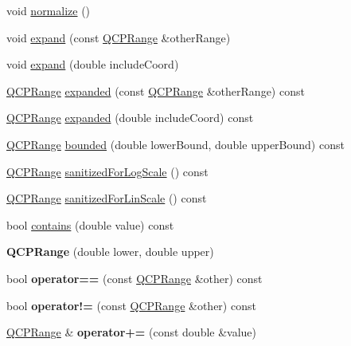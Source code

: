 \begin{DoxyCompactItemize}
void \hyperlink{class_q_c_p_range_af914a7740269b0604d0827c634a878a9}{normalize} ()
\item 
void \hyperlink{class_q_c_p_range_a0fa1bc8048be50d52bea93a8caf08305}{expand} (const \hyperlink{class_q_c_p_range}{Q\+C\+P\+Range} \&other\+Range)
\item 
void \hyperlink{class_q_c_p_range_a5fa977db0a4b7800075c629c62cf5e80}{expand} (double include\+Coord)
\item 
\hyperlink{class_q_c_p_range}{Q\+C\+P\+Range} \hyperlink{class_q_c_p_range_a9cbfb7cd06eac1839cae981e05c19633}{expanded} (const \hyperlink{class_q_c_p_range}{Q\+C\+P\+Range} \&other\+Range) const
\item 
\hyperlink{class_q_c_p_range}{Q\+C\+P\+Range} \hyperlink{class_q_c_p_range_af81d70f1add7233d73a19dcbe5decb2e}{expanded} (double include\+Coord) const
\item 
\hyperlink{class_q_c_p_range}{Q\+C\+P\+Range} \hyperlink{class_q_c_p_range_a22151e18d961d762d25721211e89c2e5}{bounded} (double lower\+Bound, double upper\+Bound) const
\item 
\hyperlink{class_q_c_p_range}{Q\+C\+P\+Range} \hyperlink{class_q_c_p_range_a3d66288d66e1d6df3636075eb42502ee}{sanitized\+For\+Log\+Scale} () const
\item 
\hyperlink{class_q_c_p_range}{Q\+C\+P\+Range} \hyperlink{class_q_c_p_range_a808751fdd9b17ef52327ba011df2e5f1}{sanitized\+For\+Lin\+Scale} () const
\item 
bool \hyperlink{class_q_c_p_range_ae9842b48b6d38dc5e9607358e3083cc8}{contains} (double value) const
\item 
\mbox{\label{class_q_c_p_range_a1d9d84d084c8f368fdedd42e0978d405}} 
{\bfseries Q\+C\+P\+Range} (double lower, double upper)
\item 
\mbox{\label{class_q_c_p_range_a9f8d1fdcf4b6d19779f1c3d9a14b09c9}} 
bool {\bfseries operator==} (const \hyperlink{class_q_c_p_range}{Q\+C\+P\+Range} \&other) const
\item 
\mbox{\label{class_q_c_p_range_a4827a37c83b8bb4bf53fcf8f6a257e77}} 
bool {\bfseries operator!=} (const \hyperlink{class_q_c_p_range}{Q\+C\+P\+Range} \&other) const
\item 
\mbox{\label{class_q_c_p_range_ad5dc7b236241944a3886b6017fb1b0c8}} 
\hyperlink{class_q_c_p_range}{Q\+C\+P\+Range} \& {\bfseries operator+=} (const double \&value)

\end{DoxyCompactItemize}
